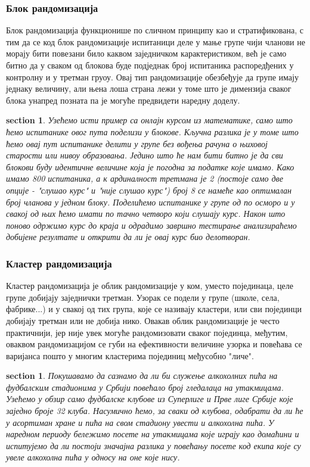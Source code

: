 \documentclass[12pt, a4paper]{article}
\newtheorem{primer}[Пример]{section}
\begin{document}
\subsubsection{Блок рандомизација}

Блок рандомизација функционише по сличном принципу као и стратификована, с тим да се код блок 
рандомизације испитаници деле у мање групе чији чланови не морају бити повезани било каквом 
заједничком карактеристиком, већ је само битно да у сваком од блокова буде подједнак број 
испитаника распоредђених у контролну и у третман груоу. Овај тип рандомизације обезбеђује да групе 
имају једнаку величину, али њена лоша страна лежи у томе што је димензија сваког блока унапред 
позната па је могуће предвидети наредну доделу. 

\begin{primer}
Узећемо исти пример са онлајн курсом из математике, само што ћемо испитанике овог пута поделизи у 
блокове. Кључна разлика је у томе што ћемо овај пут испитанике делити у групе без вођења рачуна о 
њиховој старости или нивоу образовања. Једино што ће нам бити битно је да сви блокови буду 
идентичне величине која је погодна за податке које имамо. Како имамо 800 испитаника, а к
ардиналност третмана је 2 (постоје само две опције - \textit{"слушао курс"} и 
\textit{"није слушао курс"}) број 8 се намеће као оптималан број чланова у једном блоку. 
Поделићемо испитанике у групе од по осморо и у свакој од њих ћемо имати по тачно четворо који 
слушају курс. Након што поново одржимо курс до краја и одрадимо завршно тестирање 
анализираћемо добијене резултате и открити да ли је овај курс био делотворан.
\end{primer}

\subsubsection{Кластер рандомизација}

Кластер рандомизација је облик рандомизације у ком, уместо појединаца, целе групе добијају 
заједнички третман. Узорак се подели у групе (школе, села, фабрике...) и у свакој од тих група, 
које се називају кластери, или сви појединци добијају третман или не добија нико.
Овакав облик рандомизације је често практичнији, јер није увек могуће рандомизовати сваког 
појединца, међутим, оваквом рандомизацијом се губи на ефективности величине узорка и повећава се 
варијанса пошто у многим кластерима појединиц међусобно "личе". 

\begin{primer}
Покушавамо да сазнамо да ли би служење алкохолних пића на фудбалским стадионима у Србији повећало 
број гледалаца на утакмицама. Узећемо у обзир само фудбалске клубове из Суперлиге и Прве лиге Србије 
које заједно броје 32 клуба. Насумично ћемо, за сваки од клубова, одабрати да ли ће у асортиман 
хране и пића на свом стадиону увести и алкохолна пића. У наредном периоду бележимо посете на утакмицама 
које играју као домаћини и испитујемо да ли постоји значајна разлика у повећању посете код екипа 
које су увеле алкохолна пића у односу на оне које нису.
\end{primer}
\end{document}
